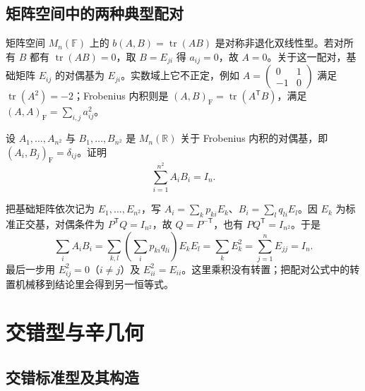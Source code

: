 \subsection{矩阵空间中的两种典型配对}

矩阵空间 $M_n(\mathbb F)$ 上的 $b(A,B)=\operatorname{tr}(AB)$ 是对称非退化双线性型。若对所有 $B$ 都有 $\operatorname{tr}(AB)=0$，取 $B=E_{ji}$ 得 $a_{ij}=0$，故 $A=0$。关于这一配对，基础矩阵 $E_{ij}$ 的对偶基为 $E_{ji}$。实数域上它不正定，例如 $A=\begin{pmatrix}0&1\\-1&0\end{pmatrix}$ 满足 $\operatorname{tr}(A^2)=-2$；Frobenius 内积则是 $(A,B)_{\mathrm F}=\operatorname{tr}(A^{\mathsf T}B)$，满足 $(A,A)_{\mathrm F}=\sum_{i,j}a_{ij}^2$。

\begin{example}
\label{ex:laex-frobenius-dual-identity}
设 $A_1,\ldots,A_{n^2}$ 与 $B_1,\ldots,B_{n^2}$ 是 $M_n(\mathbb R)$ 关于 Frobenius 内积的对偶基，即 $(A_i,B_j)_{\mathrm F}=\delta_{ij}$。证明
\[
 \sum_{i=1}^{n^2}A_iB_i=I_n.
\]
\end{example}
\begin{solve}
把基础矩阵依次记为 $E_1,\ldots,E_{n^2}$，写 $A_i=\sum_k p_{ki}E_k$、$B_i=\sum_l q_{li}E_l$。因 $E_k$ 为标准正交基，对偶条件为 $P^{\mathsf T}Q=I_{n^2}$，故 $Q=P^{-\mathsf T}$，也有 $PQ^{\mathsf T}=I_{n^2}$。于是
\[
 \sum_i A_iB_i
 =\sum_{k,l}\left(\sum_i p_{ki}q_{li}\right)E_kE_l
 =\sum_k E_k^2
 =\sum_{j=1}^n E_{jj}=I_n.
\]
最后一步用 $E_{ij}^2=0$（$i\ne j$）及 $E_{ii}^2=E_{ii}$。这里乘积没有转置；把配对公式中的转置机械移到结论里会得到另一恒等式。
\end{solve}

\section{交错型与辛几何}
\label{sec:laex-symplectic}

\subsection{交错标准型及其构造}

